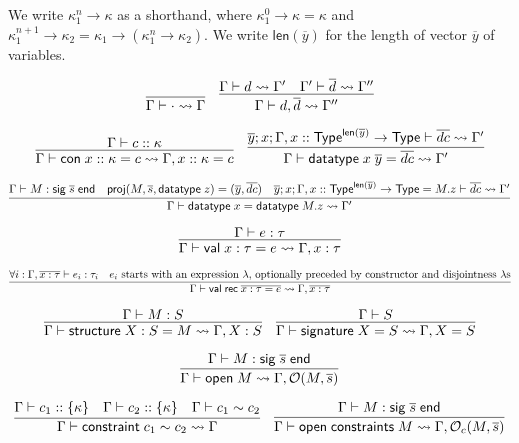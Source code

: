 \documentclass{article}
\newcommand{\mt}[1]{\mathsf{#1}}
\begin{document}
We write $\kappa_1^n \to \kappa$ as a shorthand, where $\kappa_1^0 \to \kappa = \kappa$ and $\kappa_1^{n+1} \to \kappa_2 = \kappa_1 \to (\kappa_1^n \to \kappa_2)$.  We write $\mt{len}(\overline{y})$ for the length of vector $\overline{y}$ of variables.

$$\infer{\Gamma \vdash \cdot \leadsto \Gamma}{}
\quad \infer{\Gamma \vdash d, \overline{d} \leadsto \Gamma''}{
  \Gamma \vdash d \leadsto \Gamma'
  & \Gamma' \vdash \overline{d} \leadsto \Gamma''
}$$

$$\infer{\Gamma \vdash \mt{con} \; x :: \kappa = c \leadsto \Gamma, x :: \kappa = c}{
  \Gamma \vdash c :: \kappa
}
\quad \infer{\Gamma \vdash \mt{datatype} \; x \; \overline{y} = \overline{dc} \leadsto \Gamma'}{
  \overline{y}; x; \Gamma, x :: \mt{Type}^{\mt{len}(\overline y)} \to \mt{Type} \vdash \overline{dc} \leadsto \Gamma'
}$$

$$\infer{\Gamma \vdash \mt{datatype} \; x = \mt{datatype} \; M.z \leadsto \Gamma'}{
  \Gamma \vdash M : \mt{sig} \; \overline{s} \; \mt{end}
  & \mt{proj}(M, \overline{s}, \mt{datatype} \; z) = (\overline{y}, \overline{dc})
  & \overline{y}; x; \Gamma, x :: \mt{Type}^{\mt{len}(\overline y)} \to \mt{Type} = M.z \vdash \overline{dc} \leadsto \Gamma'
}$$

$$\infer{\Gamma \vdash \mt{val} \; x : \tau = e \leadsto \Gamma, x : \tau}{
  \Gamma \vdash e : \tau
}$$

$$\infer{\Gamma \vdash \mt{val} \; \mt{rec} \; \overline{x : \tau = e} \leadsto \Gamma, \overline{x : \tau}}{
  \forall i: \Gamma, \overline{x : \tau} \vdash e_i : \tau_i
  & \textrm{$e_i$ starts with an expression $\lambda$, optionally preceded by constructor and disjointness $\lambda$s}
}$$

$$\infer{\Gamma \vdash \mt{structure} \; X : S = M \leadsto \Gamma, X : S}{
  \Gamma \vdash M : S
}
\quad \infer{\Gamma \vdash \mt{signature} \; X = S \leadsto \Gamma, X = S}{
  \Gamma \vdash S
}$$

$$\infer{\Gamma \vdash \mt{open} \; M \leadsto \Gamma, \mathcal O(M, \overline{s})}{
  \Gamma \vdash M : \mt{sig} \; \overline{s} \; \mt{end}
}$$

$$\infer{\Gamma \vdash \mt{constraint} \; c_1 \sim c_2 \leadsto \Gamma}{
  \Gamma \vdash c_1 :: \{\kappa\}
  & \Gamma \vdash c_2 :: \{\kappa\}
  & \Gamma \vdash c_1 \sim c_2
}
\quad \infer{\Gamma \vdash \mt{open} \; \mt{constraints} \; M \leadsto \Gamma, \mathcal O_c(M, \overline{s})}{
  \Gamma \vdash M : \mt{sig} \; \overline{s} \; \mt{end}
}$$
\end{document}
